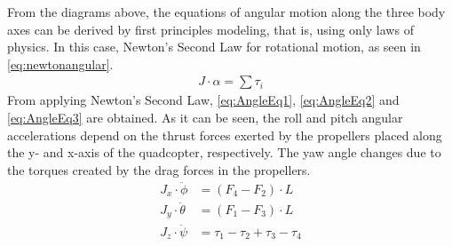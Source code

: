 From the diagrams above, the equations of angular motion along the three body axes can be derived by first principles modeling, that is, using only laws of physics. In this case, Newton's Second Law for rotational motion, as seen in \autoref{eq:newtonangular}.
%
\begin{align}
	J\cdot\alpha=\sum\tau_i
	\label{eq:newtonangular}
\end{align}
%
From applying Newton's Second Law, \autoref{eq:AngleEq1}, \ref{eq:AngleEq2} and \ref{eq:AngleEq3} are obtained. As it can be seen, the roll and pitch angular accelerations depend on the thrust forces exerted by the propellers placed along the y- and x-axis of the quadcopter, respectively. The yaw angle changes due to the torques created by the drag forces in the propellers.
%
\begin{align}
	J_x\cdot\ddot{\phi}&=(F_4-F_2)\cdot L  \label{eq:AngleEq1} \\
	J_y\cdot\ddot{\theta}&=(F_1-F_3)\cdot L  \label{eq:AngleEq2}\\
	J_z\cdot\ddot{\psi}&=\tau_1-\tau_2+\tau_3-\tau_4
	\label{eq:AngleEq3}
\end{align}
\begin{where}
\end{where}

